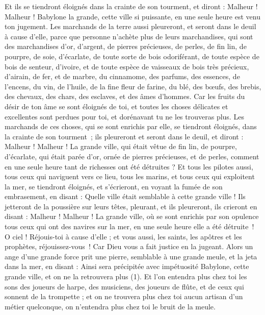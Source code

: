 \begin{multicols}{2}
Et ils se tiendront éloignés dans la crainte de son tourment, et diront : Malheur ! Malheur ! Babylone la grande, cette ville si puissante, en une seule heure est venu ton jugement.
Les marchands de la terre aussi pleureront, et seront dans le deuil à cause d'elle, parce que personne n'achète plus de leurs marchandises,
qui sont des marchandises d'or, d'argent, de pierres précieuses, de perles, de fin lin, de pourpre, de soie, d'écarlate, de toute sorte de bois odoriférant, de toute espèce de bois de senteur, d'ivoire, et de toute espèce de vaisseaux de bois très précieux, d'airain, de fer, et de marbre,
du cinnamome, des parfums, des essences, de l'encens, du vin, de l'huile, de la fine fleur de farine, du blé, des bœufs, des brebis, des chevaux, des chars, des esclaves, et des âmes d'hommes.
Car les fruits du désir de ton âme se sont éloignés de toi, et toutes les choses délicates et excellentes sont perdues pour toi, et dorénavant tu ne les trouveras plus.
Les marchands de ces choses, qui se sont enrichis par elle, se tiendront éloignés, dans la crainte de son tourment ; ils pleureront et seront dans le deuil,
et diront : Malheur ! Malheur ! La grande ville, qui était vêtue de fin lin, de pourpre, d'écarlate, qui était parée d'or, ornée de pierres précieuses, et de perles, comment en une seule heure tant de richesses ont été détruites ?
Et tous les pilotes aussi, tous ceux qui naviguent vers ce lieu, tous les marins, et tous ceux qui exploitent la mer, se tiendront éloignés,
et s’écrieront, en voyant la fumée de son embrasement, en disant : Quelle ville était semblable à cette grande ville !
Ils jetteront de la poussière sur leurs têtes, pleurant, et ils pleureront, ils crieront en disant : Malheur ! Malheur ! La grande ville, où se sont enrichis par son opulence tous ceux qui ont des navires sur la mer, en une seule heure elle a été détruite !
O ciel ! Réjouis-toi à cause d'elle ; et vous aussi, les saints, les apôtres et les prophètes, réjouissez-vous ! Car Dieu vous a fait justice en la jugeant.
Alors un ange d'une grande force prit une pierre, semblable à une grande meule, et la jeta dans la mer, en disant : Ainsi sera précipitée avec impétuosité Babylone, cette grande ville, et on ne la retrouvera plus (1).
Et l’on entendra plus chez toi les sons des joueurs de harpe, des musiciens, des joueurs de flûte, et de ceux qui sonnent de la trompette ; et on ne trouvera plus chez toi aucun artisan d’un métier quelconque, on n’entendra plus chez toi le bruit de la meule.

\end{multicols}
